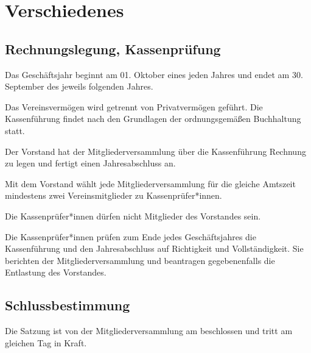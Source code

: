 \chapter{Verschiedenes}

\section{Rechnungslegung, Kassenprüfung}
\begin{absätze}
	\item Das Geschäftsjahr beginnt am 01. Oktober eines jeden Jahres und endet am 30. September des jeweils folgenden Jahres.
	\item Das Vereinsvermögen wird getrennt von Privatvermögen geführt. Die Kassenführung findet nach den Grundlagen der ordnungsgemäßen Buchhaltung statt.
	\item Der Vorstand hat der Mitgliederversammlung über die Kassenführung Rechnung zu legen und fertigt einen Jahresabschluss an.
	\item Mit dem Vorstand wählt jede Mitgliederversammlung für die gleiche Amtszeit mindestens zwei Vereinsmitglieder zu Kassenprüfer*innen. 
	\item Die Kassenprüfer*innen dürfen nicht Mitglieder des Vorstandes sein. 
    \item Die Kassenprüfer*innen prüfen zum Ende jedes Geschäftsjahres die Kassenführung und den Jahresabschluss auf Richtigkeit und Vollständigkeit. Sie berichten der Mitgliederversammlung und beantragen gegebenenfalls die Entlastung des Vorstandes.
\end{absätze}

\section{Schlussbestimmung}
Die Satzung ist von der Mitgliederversammlung am \DatumSatzung{} beschlossen und tritt am gleichen Tag in Kraft.
